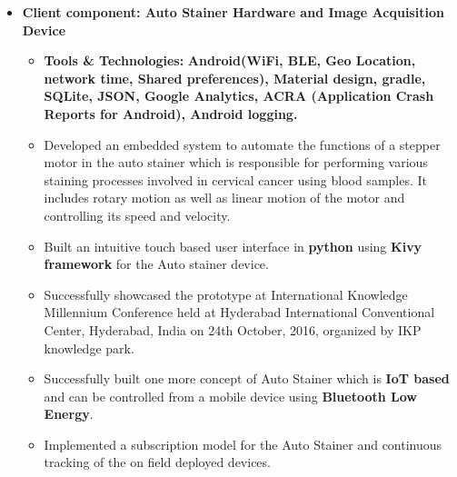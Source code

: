 \documentclass[11pt,letterpaper,sans]{moderncv}        %
\begin{document}
\begin{small}
\begin{itemize}
\begin{itemize}
\begin{itemize}
\vspace{3pt}

\item \textbf{Client component: Auto Stainer Hardware and Image Acquisition Device}
\begin{itemize}
\item \textbf{Tools \& Technologies:} \textbf{Android(WiFi, BLE, Geo Location, network time, Shared preferences), Material design, gradle, SQLite, JSON, Google Analytics, ACRA (Application Crash Reports for Android), Android logging.}
\vspace{2pt}
\item Developed an embedded system to automate the functions of a stepper motor in the auto stainer which is responsible for performing various staining processes involved in cervical cancer using blood samples. It includes rotary motion as well as linear motion of the motor and controlling its speed and velocity.
\vspace{2pt}
\item Built an intuitive touch based user interface in \textbf{python} using \textbf{Kivy framework} for the Auto stainer device.
\vspace{2pt}
\item Successfully showcased the prototype at International Knowledge Millennium Conference held at Hyderabad International Conventional Center, Hyderabad, India on 24th October, 2016, organized by IKP knowledge park.
\vspace{2pt}
\item Successfully built one more concept of Auto Stainer which is \textbf{IoT based} and can be controlled from a mobile device using \textbf{Bluetooth Low Energy}.
\vspace{2pt}
\item Implemented a subscription model for the Auto Stainer and continuous tracking of the on field deployed devices.

\end{itemize}
\end{itemize}
\end{itemize}

\vspace{2pt}

\end{itemize}
\end{small}

\vspace{5pt}
\end{document}
